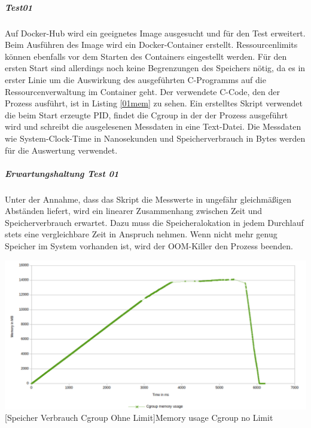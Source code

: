 \subparagraph{Test01}
Auf Docker-Hub wird ein geeignetes Image ausgesucht und für den Test erweitert. Beim Ausführen des Image wird ein Docker-Container erstellt. Ressourcenlimits können ebenfalls vor dem Starten des Containers eingestellt werden. Für den ersten Start sind allerdings noch keine Begrenzungen des Speichers nötig, da es in erster Linie um die Auswirkung des ausgeführten C-Programms auf die Ressourcenverwaltung im Container geht. Der verwendete C-Code, den der Prozess ausführt, ist in Listing \ref{01mem} zu sehen. Ein erstelltes Skript verwendet die beim Start erzeugte PID, findet die Cgroup in der der Prozess ausgeführt wird und schreibt die ausgelesenen Messdaten in eine Text-Datei. Die Messdaten wie System-Clock-Time in Nanosekunden und Speicherverbrauch in Bytes werden für die Auswertung verwendet.


\vspace{1em}


\subparagraph{Erwartungshaltung Test 01}
Unter der Annahme, dass das Skript die Messwerte in ungefähr gleichmäßigen Abständen liefert, wird ein linearer Zusammenhang zwischen Zeit und Speicherverbrauch erwartet. Dazu muss die Speicheralokation in jedem Durchlauf stets eine vergleichbare Zeit in Anspruch nehmen. Wenn nicht mehr genug Speicher im System vorhanden ist, wird der OOM-Killer den Prozess beenden.

\vspace{2em}
\begin{minipage}{\linewidth}
	\centering
	\includegraphics[width=1\linewidth]{pics/001_mem_usage_No_Limit_Cgroup_RDY_FOR_USE.png}
	[Speicher Verbrauch Cgroup Ohne Limit]{Memory usage Cgroup no Limit}
	\label{fig:001_mem_usage_No_Limit_Cgroup_RDY_FOR_USE}
\end{minipage}


